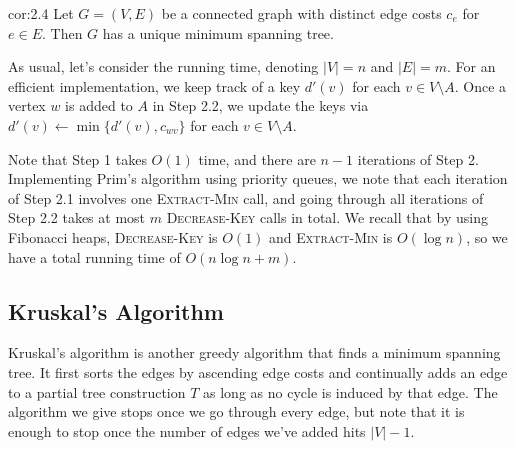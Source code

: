 \begin{cor}{cor:2.4}
    Let $G = (V, E)$ be a connected graph with distinct edge costs $c_e$ for 
    $e \in E$. Then $G$ has a unique minimum spanning tree.
\end{cor}

As usual, let's consider the running time, denoting $|V| = n$ 
and $|E| = m$. For an efficient implementation, 
we keep track of a key $d'(v)$ for each $v \in V \setminus A$. 
Once a vertex $w$ is added to $A$ in Step 2.2, we update the keys via 
$d'(v) \gets \min\{d'(v), c_{wv}\}$ for each $v \in V \setminus A$. 

Note that Step 1 takes $O(1)$ time, and 
there are $n-1$ iterations of Step 2. Implementing Prim's algorithm 
using priority queues, we note that each iteration of Step 2.1 
involves one \textsc{Extract-Min} call, and 
going through all iterations of Step 2.2 takes at most $m$ 
\textsc{Decrease-Key} calls in total. We recall that by using Fibonacci heaps, 
\textsc{Decrease-Key} is $O(1)$ and \textsc{Extract-Min} is $O(\log n)$, 
so we have a total running time of $O(n\log n + m)$.

\subsection{Kruskal's Algorithm}\label{subsec:2.4}
Kruskal's algorithm is another greedy algorithm that finds a minimum 
spanning tree. It first sorts the edges by ascending edge costs 
and continually adds an edge to a partial tree construction $T$ as long as no 
cycle is induced by that edge. The algorithm we give stops once we 
go through every edge, but note that it is enough to stop once the 
number of edges we've added hits $|V| - 1$.

